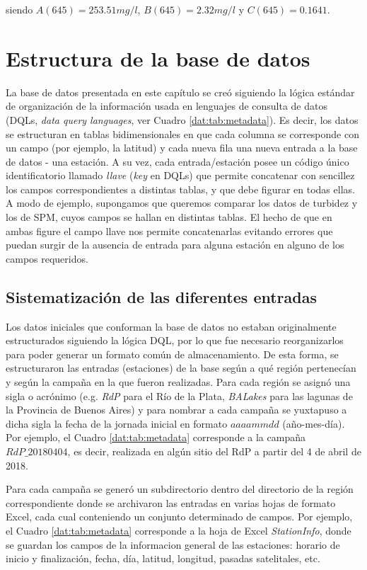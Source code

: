         \noindent
        siendo $A(645) = 253.51 mg/l$, $B(645) = 2.32 mg/l$ y $C(645) = 0.1641$.
        
        
\section{Estructura de la base de datos}
\label{dat:s:basedatos}
    La base de datos presentada en este capítulo se creó siguiendo la lógica estándar de organización de la información usada en lenguajes de consulta de datos (DQLs, \textit{data query languages}, ver Cuadro \ref{dat:tab:metadata}). Es decir, los datos se estructuran en tablas bidimensionales en que cada columna se corresponde con un campo (por ejemplo, la latitud) y cada nueva fila una nueva entrada a la base de datos - una estación. A su vez, cada entrada/estación posee un código único identificatorio llamado \textit{llave} (\textit{key} en DQLs) que permite concatenar con sencillez los campos correspondientes a distintas tablas, y que debe figurar en todas ellas. A modo de ejemplo, supongamos que queremos comparar los datos de turbidez y los de SPM, cuyos campos se hallan en distintas tablas. El hecho de que en ambas figure el campo llave nos permite concatenarlas evitando errores que puedan surgir de la ausencia de entrada para alguna estación en alguno de los campos requeridos. 
    
    \subsection{Sistematización de las diferentes entradas}
    \label{dat:s:entradas}

        Los datos iniciales que conforman la base de datos no estaban originalmente estructurados siguiendo la lógica DQL, por lo que fue necesario reorganizarlos para poder generar un formato común de almacenamiento. De esta forma, se estructuraron las entradas (estaciones) de la base según a qué región pertenecían y según la campaña en la que fueron realizadas. Para cada región se asignó una sigla o acrónimo (e.g. \textit{RdP} para el Río de la Plata, \textit{BALakes} para las lagunas de la Provincia de Buenos Aires) y para nombrar a cada campaña se yuxtapuso a dicha sigla la fecha de la jornada inicial en formato $aaaammdd$ (año-mes-día). Por ejemplo, el Cuadro \ref{dat:tab:metadata} corresponde a la campaña $RdP\_20180404$, es decir, realizada en algún sitio del RdP a partir del 4 de abril de 2018.
        
        Para cada campaña se generó un subdirectorio dentro del directorio de la región correspondiente donde se archivaron las entradas en varias hojas de formato Excel, cada cual conteniendo un conjunto determinado de campos. Por ejemplo, el Cuadro \ref{dat:tab:metadata} corresponde a la hoja de Excel \textit{StationInfo}, donde se guardan los campos de la informacion general de las estaciones: horario de inicio y finalización, fecha, día, latitud, longitud, pasadas satelitales, etc.
                    
